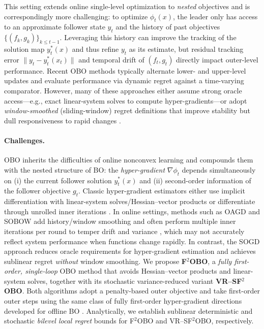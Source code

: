 \documentclass{uai2026} %
\begin{document}
This setting extends online single-level optimization to \emph{nested} objectives and is correspondingly more challenging: to optimize
\(\phi_t(x)\),
the leader only has access to an approximate follower state \(y_t\) and the history of past objectives \(\{(f_k,g_k)\}_{k\le t-1}\).
Leveraging this history can improve the tracking of the solution map $y^{*}_{t}(x)$ and thus refine \(y_t\) as its estimate,
but residual tracking error $\|y_{t}-y^{*}_{t}(x_{t})\|$ and temporal drift of $(f_{t},g_{t})$ directly impact outer-level performance.
Recent OBO methods typically alternate lower- and upper-level updates and evaluate performance via dynamic regret against a time-varying comparator. However, many of these approaches either assume strong oracle access—e.g., exact linear-system solves to compute hyper-gradients—or adopt \emph{window-smoothed} (sliding-window) regret definitions that improve stability but dull responsiveness to rapid changes \citep{tarzanagh2024online,lin2024nonconvex}.

\paragraph{Challenges.}
OBO inherits the difficulties of online nonconvex learning and compounds them with the nested structure of BO: the \emph{hyper-gradient} $\nabla\phi_t$ depends simultaneously on (i) the current follower solution $y_t^{*}(x)$ and (ii) second-order information of the follower objective $g_t$. Classic hyper-gradient estimators either use implicit differentiation with linear-system solves/Hessian–vector products \citep{pedregosa2016hyperparameter,gould2016argmin,lorraine2020implicit} or differentiate through unrolled inner iterations \citep{maclaurin2015reversible,franceschi2017forwardreverse,franceschi2018bilevel}. In online settings, methods such as OAGD and SOBOW add history/window smoothing and often perform multiple inner iterations per round to temper drift and variance \citep{ataee2024oagd,lin2023sobow,bohne2024sobbo}, which may not accurately reflect system performance when functions change rapidly. In contrast, the SOGD approach \citep{anonymous2025stochastic} reduces oracle requirements for hyper-gradient estimation and achieves sublinear regret \emph{without} window smoothing.
We propose \textbf{F$^2$OBO}, a \emph{fully first-order, single-loop} OBO method that avoids Hessian–vector products and linear-system solves, together with its stochastic variance-reduced variant \textbf{VR--SF$^2$OBO}. Both algorithms adopt a penalty-based outer objective and take first-order outer steps using the same class of fully first-order hyper-gradient directions developed for offline BO \citep{chen2025fullyfirstorder,kwon2023fully,ChenMaZhang2025}. Analytically, we establish sublinear deterministic and stochastic \emph{bilevel local regret} bounds for F$^2$OBO and VR--SF$^2$OBO, respectively.
\end{document}

